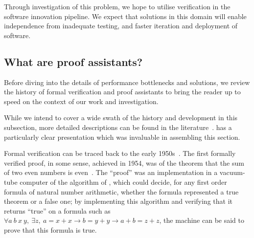 Through investigation of this problem, we hope to utilise verification in the software innovation pipeline. We expect that solutions in this domain will enable independence from inadequate testing, and faster iteration and deployment of software.


\subsection{What are proof assistants?}\label{sec:intro:history}
%
Before diving into the details of performance bottlenecks and solutions, we review the history of formal verification and proof assistants to bring the reader up to speed on the context of our work and investigation.


While we intend to cover a wide swath of the history and development in this subsection, more detailed descriptions can be found in the literature~\cites{ringer2020qed,Proof2009Geuvers,History2014Harrison,CoqArtForward2013Huet,Brief2019Darbari,davis2001early,Matuszewski05mizar:the,Automath2002Kamareddine,Milestones2019Moore,Automation2013Moore,LCF2000Gordon,LCF2019Paulson,Logical2002Pfenning}[Related Work]{nuprl}.
\textcite[ch.~4]{ringer2020qed} has a particularly clear presentation which was invaluable in assembling this section.

Formal verification can be traced back to the early 1950s~\cite{Brief2019Darbari}.
The first formally verified proof, in some sense, achieved in 1954, was of the theorem that the sum of two even numbers is even~\cite{davis2001early}.
The ``proof'' was an implementation in a vacuum-tube computer of the algorithm of \textcite{Uber1929Presburger}, which could decide, for any first order formula of natural number arithmetic, whether the formula represented a true theorem or a false one;
by implementing this algorithm and verifying that it returns ``true'' on a formula such as $\forall a\ b\ x\ y,\ \exists z,\ a = x + x \to b = y + y \to a + b = z + z$, the machine can be said to prove that this formula is true.

